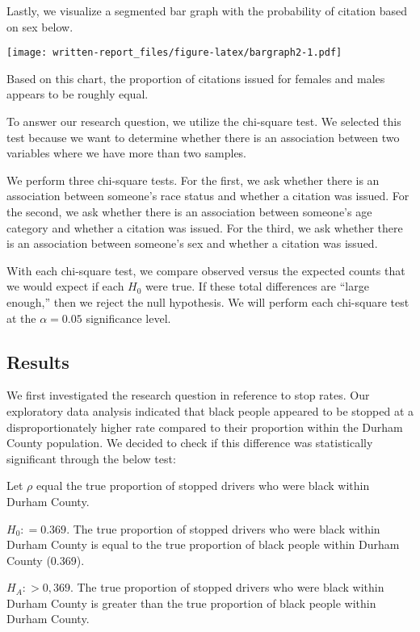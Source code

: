 \documentclass[
]{article}
\begin{document}
Lastly, we visualize a segmented bar graph with the probability of
citation based on sex below.

\texttt{[image: written-report\_files/figure-latex/bargraph2-1.pdf]}

Based on this chart, the proportion of citations issued for females and
males appears to be roughly equal.

To answer our research question, we utilize the chi-square test. We
selected this test because we want to determine whether there is an
association between two variables where we have more than two samples.

We perform three chi-square tests. For the first, we ask whether there
is an association between someone's race status and whether a citation
was issued. For the second, we ask whether there is an association
between someone's age category and whether a citation was issued. For
the third, we ask whether there is an association between someone's sex
and whether a citation was issued.

With each chi-square test, we compare observed versus the expected
counts that we would expect if each \(H_0\) were true. If these total
differences are ``large enough,'' then we reject the null hypothesis. We
will perform each chi-square test at the \(\alpha = 0.05\) significance
level.

\hypertarget{results}{%
\subsection{Results}\label{results}}

We first investigated the research question in reference to stop rates.
Our exploratory data analysis indicated that black people appeared to be
stopped at a disproportionately higher rate compared to their proportion
within the Durham County population. We decided to check if this
difference was statistically significant through the below test:

Let \(\rho\) equal the true proportion of stopped drivers who were black
within Durham County.

\(H_0: = 0.369\). The true proportion of stopped drivers who were black
within Durham County is equal to the true proportion of black people
within Durham County (0.369).

\(H_A: > 0,369\). The true proportion of stopped drivers who were black
within Durham County is greater than the true proportion of black people
within Durham County.
\end{document}
